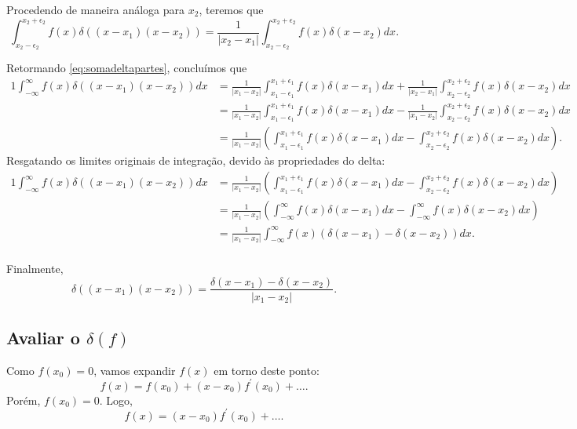 \documentclass{article}
\begin{document}
Procedendo de maneira análoga para $x_2$, teremos que
\begin{equation}
 \int_{x_2 - \epsilon_2}^{x_2 + \epsilon_2} f(x)\delta((x-x_1)(x-x_2)) = \frac{1}{|x_2 - x_1|}\int_{x_2 - \epsilon_2}^{x_2 + \epsilon_2} f(x)\delta(x-x_2) dx.
\end{equation}

Retormando \eqref{eq:somadeltapartes}, concluímos que
\begin{alignat}{1}
 \int_{-\infty}^{\infty} f(x)\delta((x-x_1)(x-x_2)) dx &= \frac{1}{|x_1 - x_2|}\int_{x_1 - \epsilon_1}^{x_1 + \epsilon_1} f(x)\delta(x-x_1) dx + 
 \frac{1}{|x_2 - x_1|}\int_{x_2 - \epsilon_2}^{x_2 + \epsilon_2} f(x)\delta(x-x_2) dx\\
 &= \frac{1}{|x_1 - x_2|}\int_{x_1 - \epsilon_1}^{x_1 + \epsilon_1} f(x)\delta(x-x_1) dx - 
 \frac{1}{|x_1 - x_2|}\int_{x_2 - \epsilon_2}^{x_2 + \epsilon_2} f(x)\delta(x-x_2) dx\\
 &= \frac{1}{|x_1 - x_2|}\left( \int_{x_1 - \epsilon_1}^{x_1 + \epsilon_1} f(x)\delta(x-x_1) dx - \int_{x_2 - \epsilon_2}^{x_2 + \epsilon_2} f(x)\delta(x-x_2) dx \right).
\end{alignat}
Resgatando os limites originais de integração, devido às propriedades do delta:
\begin{alignat}{1}
 \int_{-\infty}^{\infty} f(x)\delta((x-x_1)(x-x_2)) dx 
 &= \frac{1}{|x_1 - x_2|}\left( \int_{x_1 - \epsilon_1}^{x_1 + \epsilon_1} f(x)\delta(x-x_1) dx - \int_{x_2 - \epsilon_2}^{x_2 + \epsilon_2} f(x)\delta(x-x_2) dx \right)\\
 &= \frac{1}{|x_1 - x_2|}\left( \int_{-\infty}^{\infty} f(x)\delta(x-x_1) dx - \int_{-\infty}^{\infty} f(x)\delta(x-x_2) dx \right)\\
 &= \frac{1}{|x_1 - x_2|}\int_{-\infty}^{\infty} f(x)\left( \delta(x-x_1) - \delta(x-x_2) \right) dx.\\
\end{alignat}

Finalmente,
\begin{equation}
 \delta((x-x_1)(x-x_2)) = \frac{\delta(x-x_1) - \delta(x-x_2)}{|x_1 - x_2|}.
\end{equation}

\subsection{Avaliar o $\delta(f)$}
Como $f(x_0) = 0$, vamos expandir $f(x)$ em torno deste ponto:
\begin{equation}
 f(x) = f(x_0) + (x - x_0)f^{\prime}(x_0) + \ldots.
\end{equation}
Porém, $f(x_0) = 0$. Logo,
\begin{equation}
 f(x) = (x - x_0)f^{\prime}(x_0) + \ldots.
\end{equation}
\end{document}
